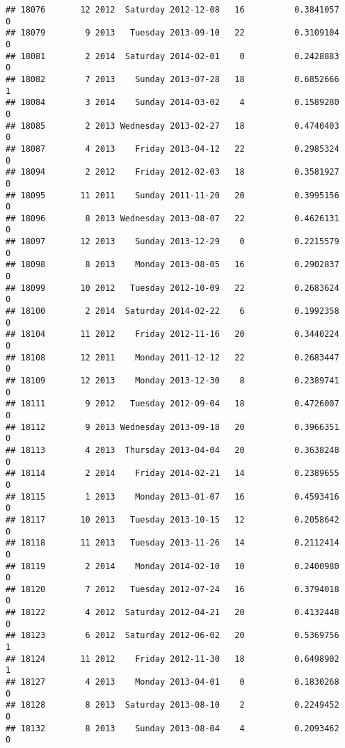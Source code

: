 \documentclass[
]{article}
\begin{document}
\begin{verbatim}
## 18076       12 2012  Saturday 2012-12-08   16          0.3841057             0
## 18079        9 2013   Tuesday 2013-09-10   22          0.3109104             0
## 18081        2 2014  Saturday 2014-02-01    0          0.2428883             0
## 18082        7 2013    Sunday 2013-07-28   18          0.6852666             1
## 18084        3 2014    Sunday 2014-03-02    4          0.1589280             0
## 18085        2 2013 Wednesday 2013-02-27   18          0.4740403             0
## 18087        4 2013    Friday 2013-04-12   22          0.2985324             0
## 18094        2 2012    Friday 2012-02-03   18          0.3581927             0
## 18095       11 2011    Sunday 2011-11-20   20          0.3995156             0
## 18096        8 2013 Wednesday 2013-08-07   22          0.4626131             0
## 18097       12 2013    Sunday 2013-12-29    0          0.2215579             0
## 18098        8 2013    Monday 2013-08-05   16          0.2902837             0
## 18099       10 2012   Tuesday 2012-10-09   22          0.2683624             0
## 18100        2 2014  Saturday 2014-02-22    6          0.1992358             0
## 18104       11 2012    Friday 2012-11-16   20          0.3440224             0
## 18108       12 2011    Monday 2011-12-12   22          0.2683447             0
## 18109       12 2013    Monday 2013-12-30    8          0.2389741             0
## 18111        9 2012   Tuesday 2012-09-04   18          0.4726007             0
## 18112        9 2013 Wednesday 2013-09-18   20          0.3966351             0
## 18113        4 2013  Thursday 2013-04-04   20          0.3638248             0
## 18114        2 2014    Friday 2014-02-21   14          0.2389655             0
## 18115        1 2013    Monday 2013-01-07   16          0.4593416             0
## 18117       10 2013   Tuesday 2013-10-15   12          0.2058642             0
## 18118       11 2013   Tuesday 2013-11-26   14          0.2112414             0
## 18119        2 2014    Monday 2014-02-10   10          0.2400980             0
## 18120        7 2012   Tuesday 2012-07-24   16          0.3794018             0
## 18122        4 2012  Saturday 2012-04-21   20          0.4132448             0
## 18123        6 2012  Saturday 2012-06-02   20          0.5369756             1
## 18124       11 2012    Friday 2012-11-30   18          0.6498902             1
## 18127        4 2013    Monday 2013-04-01    0          0.1830268             0
## 18128        8 2013  Saturday 2013-08-10    2          0.2249452             0
## 18132        8 2013    Sunday 2013-08-04    4          0.2093462             0

\end{verbatim}
\end{document}
